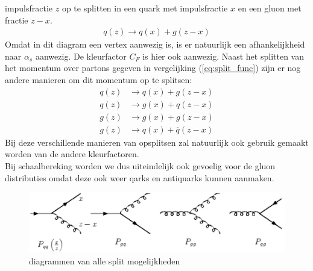 \documentclass[../main.tex]{subfiles}
\begin{document}
impulsfractie $z$ op te splitten in een quark met impulsfractie $x$ en een gluon met fractie $z-x$.
\begin{equation}
    \begin{aligned}
        \label{eq:split_func}
        q(z)\rightarrow q(x) + g(z-x)
    \end{aligned}
\end{equation}
Omdat in dit diagram een vertex aanwezig is, is er natuurlijk een afhankelijkheid naar $\alpha_s$ aanwezig. De kleurfactor $C_F$ is hier ook aanwezig. Naast het splitten van het momentum over partons gegeven in vergelijking (\ref{eq:split_func}) zijn er nog andere manieren om dit momentum op te splitsen:
\begin{equation}
    \begin{aligned}
        \label{eq:split_func_all}
        q(z)&\rightarrow q(x) + g(z-x)\\
        q(z)&\rightarrow g(x) + q(z-x)\\
        g(z)&\rightarrow g(x) + g(z-x)\\
        g(z)&\rightarrow q(x) + \overline q(z-x)
    \end{aligned}
\end{equation}
Bij deze verschillende manieren van opsplitsen zal natuurlijk ook gebruik gemaakt worden van de andere kleurfactoren.\\
Bij schaalbereking worden we dus uiteindelijk ook gevoelig voor de gluon distributies omdat deze ook weer qarks en antiquarks kunnen aanmaken.

\begin{figure}[h]
    \centering
    \includegraphics[width=0.8\linewidth]{QCD/split_func_all.png}
    \caption{diagrammen van alle split mogelijkheden}%
    \label{fig:split_func_all}
\end{figure}
\end{document}
